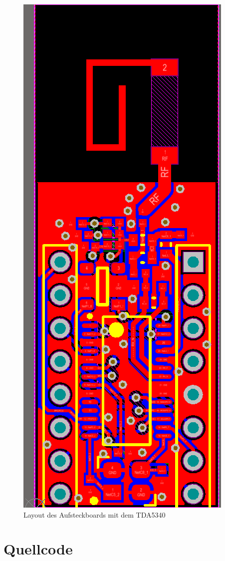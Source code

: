 \begin{figure}[h] 
	\centering
	\includegraphics[height=\textwidth, angle=-90 ]{Abbildungen/Aufnahmen/Bilder/Altium/Layout_Stefan_Erhard/Layout.png}
	\caption{Layout des Aufsteckboards mit dem TDA5340}
	\label{fig:AufsteckboardTDA}
\end{figure}

\section{Quellcode}
%